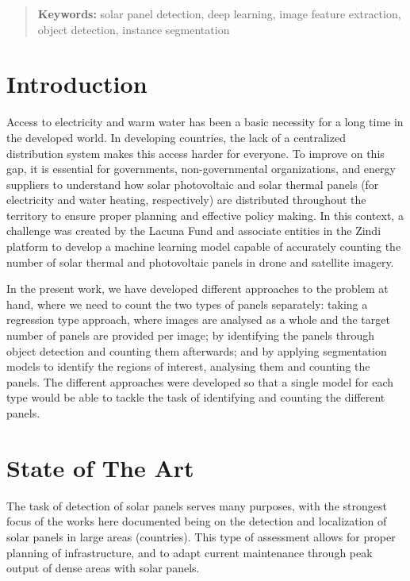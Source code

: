 \documentclass[conference]{IEEEtran}
\begin{document}
\begin{quote}
\small
\noindent
\textbf{Keywords:} solar panel detection, deep learning, image feature extraction, object detection, instance segmentation
\end{quote}

\IEEEpeerreviewmaketitle


\section{Introduction}

Access to electricity and warm water has been a basic necessity for a long time in the developed world. In developing countries, the lack of a centralized distribution system makes this access harder for everyone. To improve on this gap, it is essential for governments, non-governmental organizations, and energy suppliers to understand how solar photovoltaic and solar thermal panels (for electricity and water heating, respectively) are distributed throughout the territory to ensure proper planning and effective policy making. In this context, a challenge was created by the Lacuna Fund and associate entities in the Zindi platform to develop a machine learning model capable of accurately counting the number of solar thermal and photovoltaic panels in drone and satellite imagery.

In the present work, we have developed different approaches to the problem at hand, where we need to count the two types of panels separately: taking a regression type approach, where images are analysed as a whole and the target number of panels are provided per image; by identifying the panels through object detection and counting them afterwards; and by applying segmentation models to identify the regions of interest, analysing them and counting the panels. The different approaches were developed so that a single model for each type would be able to tackle the task of identifying and counting the different panels.

\section{State of The Art}

The task of detection of solar panels serves many purposes, with the strongest focus of the works here documented being on the detection and localization of solar panels in large areas (countries). This type of assessment allows for proper planning of infrastructure, and to adapt current maintenance through peak output of dense areas with solar panels.
\end{document}
